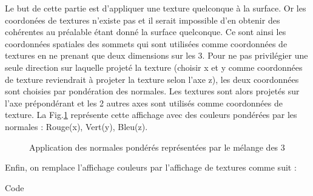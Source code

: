 \documentclass[a4paper]{article}
\begin{document}
Le but de cette partie est d'appliquer une texture quelconque à la surface. Or les coordonées de textures n'existe pas et il serait impossible d'en obtenir des cohérentes au préalable étant donné la surface quelconque. Ce sont ainsi les coordonnées spatiales des sommets qui sont utilisées comme coordonnées de textures en ne prenant que deux dimensions sur les 3. Pour ne pas privilégier une seule direction sur laquelle projeté la texture (choisir x et y comme coordonnées de texture reviendrait à projeter la texture selon l'axe z), les deux coordonnées sont choisies par pondération des normales. Les textures sont alors projetés sur l'axe prépondérant et les 2 autres axes sont utilisés comme coordonnées de texture. La Fig.\ref{normalesCouleurs} représente cette affichage avec des couleurs pondérées par les normales : Rouge(x), Vert(y), Bleu(z). 

\begin{figure}[H]
\centering
{}
\caption{Application des normales pondérés représentées par le mélange des 3}
\label{normalesCouleurs}
\end{figure}

Enfin, on remplace l'affichage couleurs par l'affichage de textures comme suit : 

Code
\end{document}
